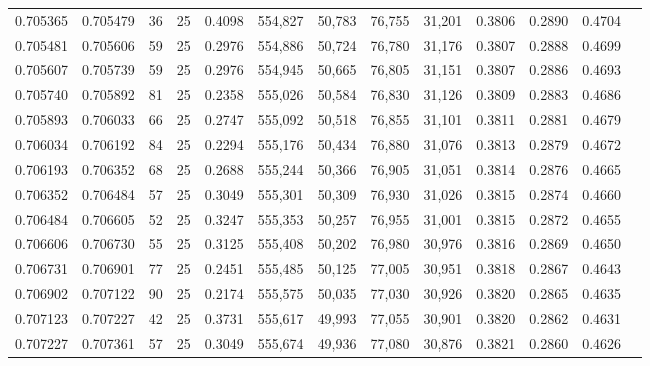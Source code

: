 \begin{tabular}{rrrrrrrrrrrrr}
0.705365 & 0.705479 &    36 &  25 &                                     0.4098 & 554,827 &  50,783 &  76,755 &  31,201 & 0.3806 & 0.2890 & 0.4704 \\
0.705481 & 0.705606 &    59 &  25 &                                     0.2976 & 554,886 &  50,724 &  76,780 &  31,176 & 0.3807 & 0.2888 & 0.4699 \\
0.705607 & 0.705739 &    59 &  25 &                                     0.2976 & 554,945 &  50,665 &  76,805 &  31,151 & 0.3807 & 0.2886 & 0.4693 \\
0.705740 & 0.705892 &    81 &  25 &                                     0.2358 & 555,026 &  50,584 &  76,830 &  31,126 & 0.3809 & 0.2883 & 0.4686 \\
0.705893 & 0.706033 &    66 &  25 &                                     0.2747 & 555,092 &  50,518 &  76,855 &  31,101 & 0.3811 & 0.2881 & 0.4679 \\
0.706034 & 0.706192 &    84 &  25 &                                     0.2294 & 555,176 &  50,434 &  76,880 &  31,076 & 0.3813 & 0.2879 & 0.4672 \\
0.706193 & 0.706352 &    68 &  25 &                                     0.2688 & 555,244 &  50,366 &  76,905 &  31,051 & 0.3814 & 0.2876 & 0.4665 \\
0.706352 & 0.706484 &    57 &  25 &                                     0.3049 & 555,301 &  50,309 &  76,930 &  31,026 & 0.3815 & 0.2874 & 0.4660 \\
0.706484 & 0.706605 &    52 &  25 &                                     0.3247 & 555,353 &  50,257 &  76,955 &  31,001 & 0.3815 & 0.2872 & 0.4655 \\
0.706606 & 0.706730 &    55 &  25 &                                     0.3125 & 555,408 &  50,202 &  76,980 &  30,976 & 0.3816 & 0.2869 & 0.4650 \\
0.706731 & 0.706901 &    77 &  25 &                                     0.2451 & 555,485 &  50,125 &  77,005 &  30,951 & 0.3818 & 0.2867 & 0.4643 \\
0.706902 & 0.707122 &    90 &  25 &                                     0.2174 & 555,575 &  50,035 &  77,030 &  30,926 & 0.3820 & 0.2865 & 0.4635 \\
0.707123 & 0.707227 &    42 &  25 &                                     0.3731 & 555,617 &  49,993 &  77,055 &  30,901 & 0.3820 & 0.2862 & 0.4631 \\
0.707227 & 0.707361 &    57 &  25 &                                     0.3049 & 555,674 &  49,936 &  77,080 &  30,876 & 0.3821 & 0.2860 & 0.4626 \\

\end{tabular}
